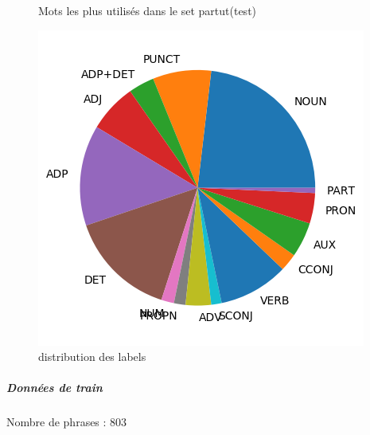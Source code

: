 \begin{figure}[H]
\begin{minipage}{0.48\textwidth}
\begin{tabular}{|l || *{11 }{|c} |}
\end{tabular}
\caption{ Mots les plus utilisés dans le set partut(test) } \label{Fig:muw}\end{minipage} 
\begin{minipage}{0.48\textwidth} \centering
\includegraphics[width=.7\linewidth]{partuttest_img.png}
\caption{distribution des labels}
\end{minipage}
\end{figure} \subparagraph{Données de train \\ }  
 Nombre de phrases : 803\\ 
